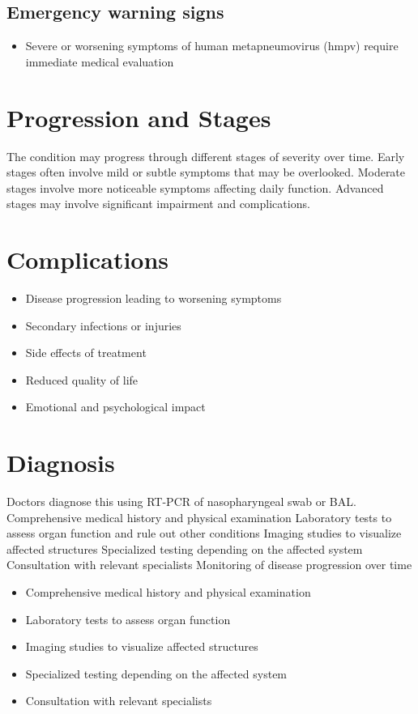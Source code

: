 \subsection{Emergency warning signs}
\begin{itemize}[noitemsep]
  \item Severe or worsening symptoms of human metapneumovirus (hmpv) require immediate medical evaluation
\end{itemize}
\section{Progression and Stages}
The condition may progress through different stages of severity over time. Early stages often involve mild or subtle symptoms that may be overlooked. Moderate stages involve more noticeable symptoms affecting daily function. Advanced stages may involve significant impairment and complications.
\section{Complications}
\begin{itemize}[noitemsep]
  \item Disease progression leading to worsening symptoms
  \item Secondary infections or injuries
  \item Side effects of treatment
  \item Reduced quality of life
  \item Emotional and psychological impact
\end{itemize}
\section{Diagnosis}
Doctors diagnose this using RT-PCR of nasopharyngeal swab or BAL. Comprehensive medical history and physical examination Laboratory tests to assess organ function and rule out other conditions Imaging studies to visualize affected structures Specialized testing depending on the affected system Consultation with relevant specialists Monitoring of disease progression over time

\begin{itemize}[noitemsep]
  \item Comprehensive medical history and physical examination
  \item Laboratory tests to assess organ function
  \item Imaging studies to visualize affected structures
  \item Specialized testing depending on the affected system
  \item Consultation with relevant specialists
\end{itemize}
